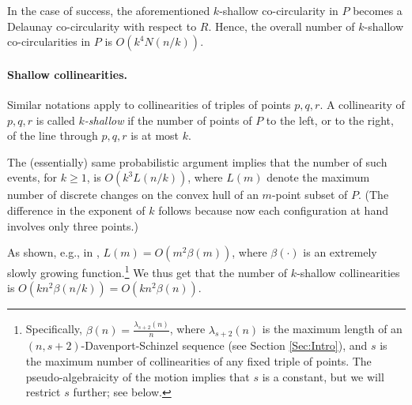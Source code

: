 \documentclass[letter,11pt]{article}
\begin{document}
In the case of success, the aforementioned $k$-shallow co-circularity in $P$ becomes a Delaunay co-circularity with respect to $R$. 
Hence, the overall number of $k$-shallow co-circularities in $P$ is $O(k^4 N(n/k))$.


\paragraph{Shallow collinearities.} Similar notations apply to collinearities of triples of points $p,q,r$. A collinearity of $p,q,r$ is called {\it $k$-shallow} if the number of points of $P$ to the left, or to the right, of the line through $p,q,r$ is at most $k$. 

The (essentially) same probabilistic argument implies that the number of such events, for $k\geq 1$, is $O(k^3L(n/k))$, where $L(m)$ denote the maximum number of discrete changes on the convex hull of an $m$-point subset of $P$. (The difference in the exponent of $k$ follows because now each configuration at hand involves only three points.)

As shown, e.g., in \cite[Section 8.6.1]{SA95},  $L(m)=O(m^2\beta(m))$, where $\beta(\cdot)$ is an extremely slowly growing function.\footnote{Specifically,
$\beta(n)=\frac{\lambda_{s+2}(n)}{n}$, where $\lambda_{s+2}(n)$ is the maximum length of an $(n,s+2)$-Davenport-Schinzel sequence (see Section \ref{Sec:Intro}), and $s$ is the maximum number of collinearities of any fixed triple of points. The pseudo-algebraicity of the motion implies that $s$ is a constant, but we will restrict $s$ further; see below.} We thus get that the number of $k$-shallow collinearities is $O(kn^2\beta(n/k))=O(kn^2\beta(n))$. 
\end{document}
